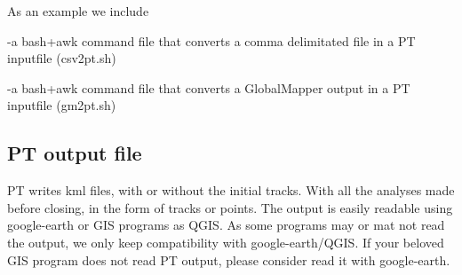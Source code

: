 As an example we include 

		-a bash+awk command file that converts a comma delimitated file in a PT inputfile (csv2pt.sh)

		-a bash+awk command file that converts a GlobalMapper output in a PT inputfile (gm2pt.sh)


\vspace{-7\baselineskip}
\vspace{7\baselineskip}
		 
	 

\vspace{-7\baselineskip}
\vspace{7\baselineskip}
	
	
\subsection*{PT output file}

PT writes kml files, with or without the initial tracks. With all the analyses made before closing, in the form of tracks or points.
	The output is easily readable using google-earth or GIS programs as
	QGIS. As some programs may or mat not read the output, we only keep
	compatibility with google-earth/QGIS. If your beloved GIS program
	does not read PT output, please consider read it with google-earth.  

